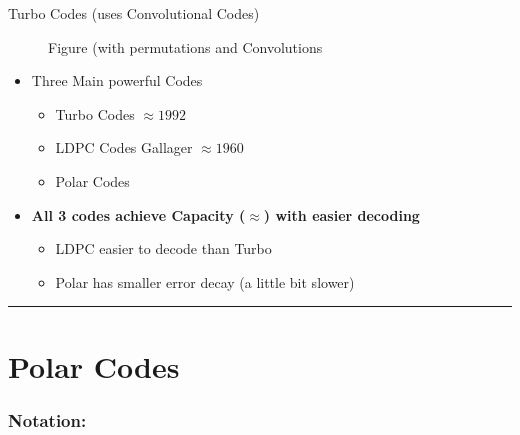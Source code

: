 \documentclass[11pt]{article}
\providecommand{\tightlist}{%
      \setlength{\itemsep}{0pt}\setlength{\parskip}{0pt}}
\begin{document}
    Turbo Codes (uses Convolutional Codes)

\begin{figure}
\centering
{}
\caption{Figure (with permutations and Convolutions}
\end{figure}

    \begin{itemize}
\tightlist
\item
  Three Main powerful Codes

  \begin{itemize}
  \tightlist
  \item
    Turbo Codes \(\approx 1992\)
  \item
    LDPC Codes Gallager \(\approx 1960\)
  \item
    Polar Codes
  \end{itemize}
\item
  \textbf{All 3 codes achieve Capacity (\(\approx\)) with easier
  decoding}

  \begin{itemize}
  \tightlist
  \item
    LDPC easier to decode than Turbo
  \item
    Polar has smaller error decay (a little bit slower)
  \end{itemize}
\end{itemize}

\begin{center}\rule{0.5\linewidth}{0.5pt}\end{center}

    \section{\texorpdfstring{\textbf{Polar
Codes}}{Polar Codes}}\label{polar-codes}

\subsubsection{Notation:}\label{notation}
\end{document}

